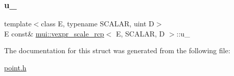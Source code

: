 \mbox{\label{structmui_1_1vexpr__scale__rcp_a72d43edaa3c545d5e06e561512b533ec}} 
\subsubsection{\texorpdfstring{u\+\_\+}{u\_}}
{\footnotesize\ttfamily template$<$class E, typename S\+C\+A\+L\+AR, uint D$>$ \\
E const\& \hyperlink{structmui_1_1vexpr__scale__rcp}{mui\+::vexpr\+\_\+scale\+\_\+rcp}$<$ E, S\+C\+A\+L\+AR, D $>$\+::u\+\_\+\hspace{0.3cm}{\ttfamily [protected]}}



The documentation for this struct was generated from the following file\+:\begin{DoxyCompactItemize}
\item 
\hyperlink{point_8h}{point.\+h}\end{DoxyCompactItemize}
